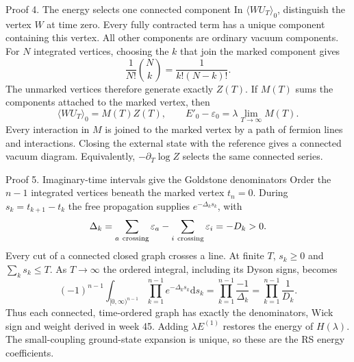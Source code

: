 \documentclass[aspectratio=169,10pt]{beamer}
\newcommand{\dd}{\mathrm{d}}
\newcommand{\av}[1]{\langle #1\rangle_0}
\begin{document}
\begin{frame}{Proof 4. The energy selects one connected component}
In $\av{W U_T}$, distinguish the vertex $W$ at time zero. Every fully contracted term has a unique component containing this vertex. All other components are ordinary vacuum components. For $N$ integrated vertices, choosing the $k$ that join the marked component gives
\[
 \frac{1}{N!}\binom Nk=\frac{1}{k!(N-k)!}.
\]
The unmarked vertices therefore generate exactly $Z(T)$. If $M(T)$ sums the components attached to the marked vertex, then
\[
 \av{W U_T}=M(T) Z(T),\qquad E'_0-\varepsilon_0=\lambda\lim_{T\to\infty}M(T).
\]
Every interaction in $M$ is joined to the marked vertex by a path of fermion lines and interactions. Closing the external state with the reference gives a connected vacuum diagram. Equivalently, $-\partial_T\log Z$ selects the same connected series.
\end{frame}

\begin{frame}{Proof 5. Imaginary-time intervals give the Goldstone denominators}
Order the $n-1$ integrated vertices beneath the marked vertex $t_n=0$. During $s_k=t_{k+1}-t_k$ the free propagation supplies $e^{-\Delta_k s_k}$, with
\[
 \Delta_k=\sum_{a\ {\rm crossing}}\varepsilon_a-
           \sum_{i\ {\rm crossing}}\varepsilon_i=-D_k>0.
\]
Every cut of a connected closed graph crosses a line. At finite $T$, $s_k\ge0$ and $\sum_k s_k\le T$. As $T\to\infty$ the ordered integral, including its Dyson signs, becomes
\[
 (-1)^{n-1}\int_{[0,\infty)^{n-1}}\prod_{k=1}^{n-1}e^{-\Delta_k s_k}\dd s_k
 =\prod_{k=1}^{n-1}\frac{-1}{\Delta_k}=\prod_{k=1}^{n-1}\frac1{D_k}.
\]
Thus each connected, time-ordered graph has exactly the denominators, Wick sign and weight derived in week 45. Adding $\lambda E^{(1)}$ restores the energy of $H(\lambda)$. The small-coupling ground-state expansion is unique, so these are the RS energy coefficients.
\end{frame}
\end{document}
